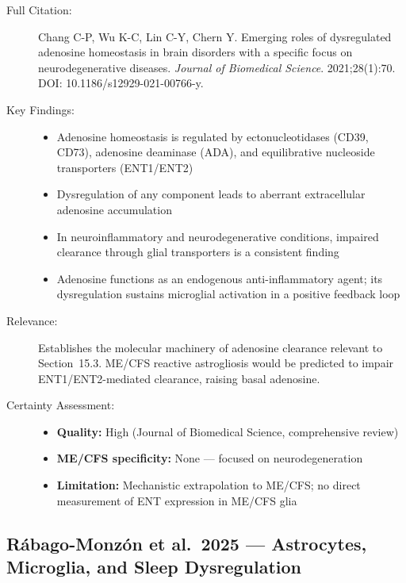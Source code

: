 \begin{description}
    \item[Full Citation:] Chang C-P, Wu K-C, Lin C-Y, Chern Y\@. Emerging roles of dysregulated adenosine homeostasis in brain disorders with a specific focus on neurodegenerative diseases. \textit{Journal of Biomedical Science}. 2021;28(1):70. DOI: 10.1186/s12929-021-00766-y.
    \item[Key Findings:]
    \begin{itemize}
        \item Adenosine homeostasis is regulated by ectonucleotidases (CD39, CD73), adenosine deaminase (ADA), and equilibrative nucleoside transporters (ENT1/ENT2)
        \item Dysregulation of any component leads to aberrant extracellular adenosine accumulation
        \item In neuroinflammatory and neurodegenerative conditions, impaired clearance through glial transporters is a consistent finding
        \item Adenosine functions as an endogenous anti-inflammatory agent; its dysregulation sustains microglial activation in a positive feedback loop
    \end{itemize}
    \item[Relevance:] Establishes the molecular machinery of adenosine clearance relevant to Section~15.3. ME/CFS reactive astrogliosis would be predicted to impair ENT1/ENT2-mediated clearance, raising basal adenosine.
    \item[Certainty Assessment:]
    \begin{itemize}
        \item \textbf{Quality:} High (Journal of Biomedical Science, comprehensive review)
        \item \textbf{ME/CFS specificity:} None --- focused on neurodegeneration
        \item \textbf{Limitation:} Mechanistic extrapolation to ME/CFS; no direct measurement of ENT expression in ME/CFS glia
    \end{itemize}
\end{description}

\subsection{R\'{a}bago-Monz\'{o}n et al.\ 2025 --- Astrocytes, Microglia, and Sleep Dysregulation}

